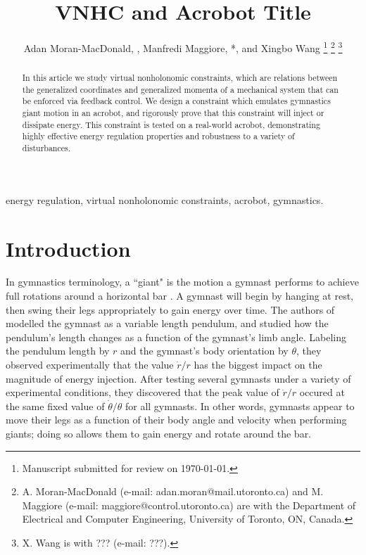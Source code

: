\documentclass[journal,twoside,onecolumn,draftclsnofoot,web]{ieeecolor}
\newcommand*{\Title}{VNHC and Acrobot Title}
\begin{document}
\title{\Title}
\author{Adan Moran-MacDonald, , Manfredi Maggiore,
*, and Xingbo Wang
\thanks{Manuscript submitted for review on \today.}
\thanks{A. Moran-MacDonald (e-mail: adan.moran@mail.utoronto.ca) and
M. Maggiore (e-mail: maggiore@control.utoronto.ca) are with the Department of
Electrical and Computer Engineering, University of Toronto, ON, Canada.}
\thanks{X. Wang is with ??? (e-mail: ???).}
} %

\maketitle

\begin{abstract}
    In this article we study virtual nonholonomic constraints, which are
    relations between the generalized coordinates and generalized momenta of a
    mechanical system that can be enforced via feedback control.
    We design a constraint which emulates gymnastics giant motion in an
    acrobot, and rigorously prove that this constraint will inject or dissipate
    energy.
    This constraint is tested on a real-world acrobot, demonstrating highly
    effective energy regulation properties and robustness to a variety of
    disturbances.
\end{abstract}

\begin{IEEEkeywords}
    energy regulation, virtual nonholonomic constraints, acrobot, gymnastics.
\end{IEEEkeywords}

\section{Introduction}\label{sec:introduction}

In gymnastics terminology, a ``giant" is the motion a gymnast performs to
achieve full rotations around a horizontal bar \cite{usagym_giant}. 
A gymnast will begin by hanging at rest, then swing their legs
appropriately to gain energy over time.
The authors of \cite{pendulum_length_giant_gymnastics} modelled the gymnast as a
variable length pendulum, and studied how the pendulum's length changes as a
function of the gymnast's limb angle.
Labeling the pendulum length by \(r\) and the gymnast's body orientation
by \(\theta\), they observed experimentally that the value \(\dot{r}/r\) has
the biggest impact on the magnitude of energy injection. 
After testing several gymnasts under a variety of experimental conditions, 
they discovered that the peak value of \(\dot{r}/r\) occured at the same fixed
value of \(\dot{\theta}/\theta\) for all gymnasts.
In other words, gymnasts appear to move their legs as a function of their body
angle and velocity when performing giants; 
doing so allows them to gain energy and rotate around the bar.
\end{document}
